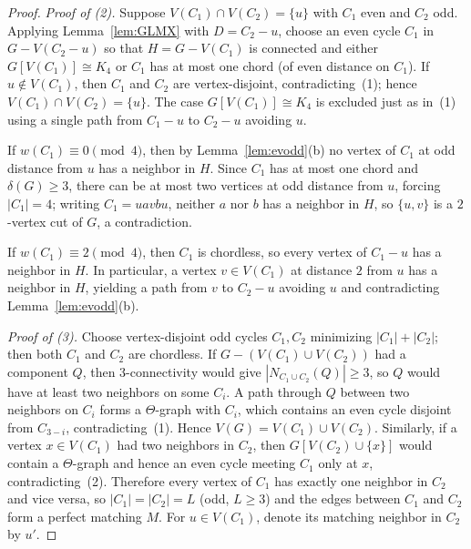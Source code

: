 \documentclass[10pt,letterpaper]{article}
\theoremstyle{zetaplain}
\theoremstyle{zetadef}
\theoremstyle{remark}
\numberwithin{equation}{section}
\begin{document}
\begin{proof}
\medskip
\emph{Proof of (2).} Suppose $V(C_1) \cap V(C_2) = \{u\}$ with $C_1$ even and $C_2$ odd. Applying Lemma~\ref{lem:GLMX} with $D = C_2 - u$, choose an even cycle $C_1$ in $G - V(C_2 - u)$ so that $H = G - V(C_1)$ is connected and either $G[V(C_1)] \cong K_4$ or $C_1$ has at most one chord (of even distance on $C_1$). If $u \notin V(C_1)$, then $C_1$ and $C_2$ are vertex-disjoint, contradicting~(1); hence $V(C_1) \cap V(C_2) = \{u\}$. The case $G[V(C_1)] \cong K_4$ is excluded just as in~(1) using a single path from $C_1 - u$ to $C_2 - u$ avoiding $u$.

If $w(C_1) \equiv 0 \pmod 4$, then by Lemma~\ref{lem:evodd}(b) no vertex of $C_1$ at odd distance from $u$ has a neighbor in $H$. Since $C_1$ has at most one chord and $\delta(G) \ge 3$, there can be at most two vertices at odd distance from $u$, forcing $|C_1| = 4$; writing $C_1 = u a v b u$, neither $a$ nor $b$ has a neighbor in $H$, so $\{u, v\}$ is a $2$-vertex cut of $G$, a contradiction.

If $w(C_1) \equiv 2 \pmod 4$, then $C_1$ is chordless, so every vertex of $C_1 - u$ has a neighbor in $H$. In particular, a vertex $v \in V(C_1)$ at distance $2$ from $u$ has a neighbor in $H$, yielding a path from $v$ to $C_2 - u$ avoiding $u$ and contradicting Lemma~\ref{lem:evodd}(b).

\medskip
\emph{Proof of (3).} Choose vertex-disjoint odd cycles $C_1, C_2$ minimizing $|C_1| + |C_2|$; then both $C_1$ and $C_2$ are chordless. If $G - (V(C_1) \cup V(C_2))$ had a component $Q$, then $3$-connectivity would give $|N_{C_1 \cup C_2}(Q)| \ge 3$, so $Q$ would have at least two neighbors on some $C_i$. A path through $Q$ between two neighbors on $C_i$ forms a $\Theta$-graph with $C_i$, which contains an even cycle disjoint from $C_{3-i}$, contradicting~(1). Hence $V(G) = V(C_1) \cup V(C_2)$. Similarly, if a vertex $x \in V(C_1)$ had two neighbors in $C_2$, then $G[V(C_2) \cup \{x\}]$ would contain a $\Theta$-graph and hence an even cycle meeting $C_1$ only at $x$, contradicting~(2). Therefore every vertex of $C_1$ has exactly one neighbor in $C_2$ and vice versa, so $|C_1| = |C_2| = L$ (odd, $L \ge 3$) and the edges between $C_1$ and $C_2$ form a perfect matching $M$. For $u \in V(C_1)$, denote its matching neighbor in $C_2$ by $u'$.


\end{proof}
\end{document}
